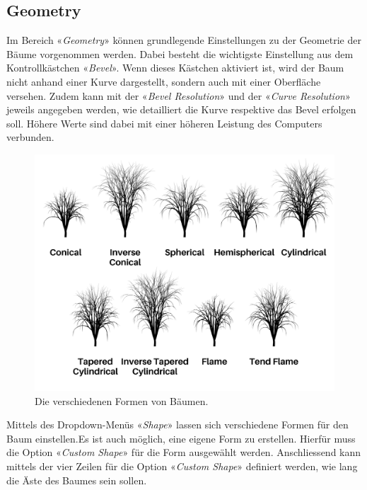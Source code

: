 \documentclass[
]{book}
\let\oldmarginnote\marginnote
\renewcommand{\marginnote}[1]{%
  \oldmarginnote{{\footnotesize\selectfont #1}}%
}
\begin{document}
\subsection{Geometry}\label{geometry}

\marginnote{Bevel-Option}

Im Bereich «\emph{Geometry}» können grundlegende Einstellungen zu der
Geometrie der Bäume vorgenommen werden. Dabei besteht die wichtigste
Einstellung aus dem Kontrollkästchen «\emph{Bevel}». Wenn dieses
Kästchen aktiviert ist, wird der Baum nicht anhand einer Kurve
dargestellt, sondern auch mit einer Oberfläche versehen. Zudem kann mit
der «\emph{Bevel Resolution}» und der «\emph{Curve Resolution}» jeweils
angegeben werden, wie detailliert die Kurve respektive das Bevel
erfolgen soll. Höhere Werte sind dabei mit einer höheren Leistung des
Computers verbunden.

\begin{figure}

\includegraphics{Chapters/Images/Chapter_39/39_1_Tree_Forms.png}

\caption{\label{fig-1_1}Die verschiedenen Formen von Bäumen.}

\end{figure}%

\marginnote{Shape}

Mittels des Dropdown-Menüs «\emph{Shape}» lassen sich verschiedene
Formen für den Baum einstellen.Es ist auch möglich, eine eigene Form zu
erstellen. Hierfür muss die Option «\emph{Custom Shape}» für die Form
ausgewählt werden. Anschliessend kann mittels der vier Zeilen für die
Option «\emph{Custom Shape}» definiert werden, wie lang die Äste des
Baumes sein sollen.
\end{document}
